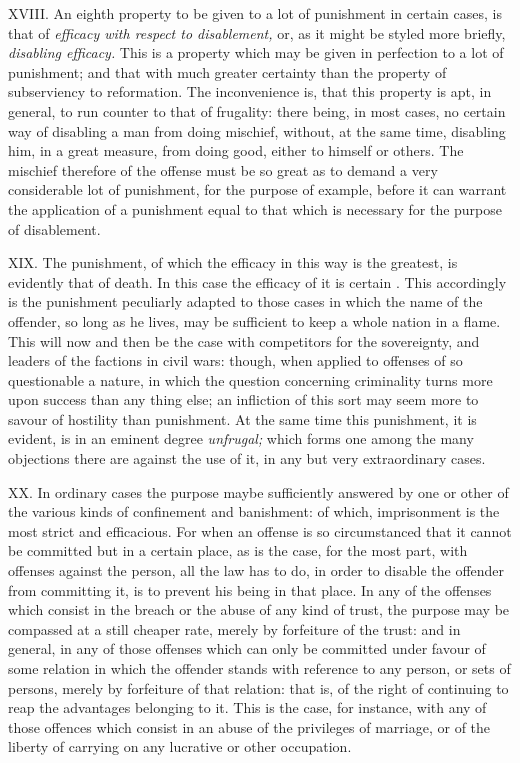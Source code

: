 \documentclass[12pt]{report}
\begin{document}
XVIII. An eighth property to be given to a lot of punishment in certain
cases, is that of \emph{efficacy with respect to disablement,} or, as it
might be styled more briefly, \emph{disabling efficacy.} This is a
property which may be given in perfection to a lot of punishment; and
that with much greater certainty than the property of subserviency to
reformation. The inconvenience is, that this property is apt, in
general, to run counter to that of frugality: there being, in most
cases, no certain way of disabling a man from doing mischief, without,
at the same time, disabling him, in a great measure, from doing good,
either to himself or others. The mischief therefore of the offense must
be so great as to demand a very considerable lot of punishment, for the
purpose of example, before it can warrant the application of a
punishment equal to that which is necessary for the purpose of
disablement.

XIX. The punishment, of which the efficacy in this way is the greatest,
is evidently that of death. In this case the efficacy of it is certain .
This accordingly is the punishment peculiarly adapted to those cases in
which the name of the offender, so long as he lives, may be sufficient
to keep a whole nation in a flame. This will now and then be the case
with competitors for the sovereignty, and leaders of the factions in
civil wars: though, when applied to offenses of so questionable a
nature, in which the question concerning criminality turns more upon
success than any thing else; an infliction of this sort may seem more to
savour of hostility than punishment. At the same time this punishment,
it is evident, is in an eminent degree \emph{unfrugal;} which forms one
among the many objections there are against the use of it, in any but
very extraordinary cases.

XX. In ordinary cases the purpose maybe sufficiently answered by one or
other of the various kinds of confinement and banishment: of which,
imprisonment is the most strict and efficacious. For when an offense is
so circumstanced that it cannot be committed but in a certain place, as
is the case, for the most part, with offenses against the person, all
the law has to do, in order to disable the offender from committing it,
is to prevent his being in that place. In any of the offenses which
consist in the breach or the abuse of any kind of trust, the purpose may
be compassed at a still cheaper rate, merely by forfeiture of the trust:
and in general, in any of those offenses which can only be committed
under favour of some relation in which the offender stands with
reference to any person, or sets of persons, merely by forfeiture of
that relation: that is, of the right of continuing to reap the
advantages belonging to it. This is the case, for instance, with any of
those offences which consist in an abuse of the privileges of marriage,
or of the liberty of carrying on any lucrative or other occupation.
\end{document}
